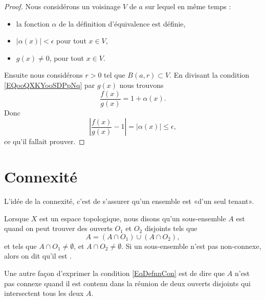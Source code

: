 \begin{proof}
	Nous considérons un voisinage \( V\) de \( a\) sur lequel en même temps :
	\begin{itemize}
		\item
		      la fonction \( \alpha\) de la définition d'équivalence est définie,
		\item
		      \( | \alpha(x) |<\epsilon\) pour tout \( x\in V\),
		\item
		      \( g(x)\neq 0\), pour tout \( x\in V\).
	\end{itemize}
	Ensuite nous considérons \( r>0\) tel que \( B(a,r)\subset V\). En divisant la condition \eqref{EQooQXKYooSDPpNq} par \( g(x)\) nous trouvons
	\begin{equation}
		\frac{ f(x) }{ g(x) }=1+\alpha(x).
	\end{equation}
	Donc
	\begin{equation}
		| \frac{ f(x) }{ g(x) }-1 |=| \alpha(x) |\leq \epsilon,
	\end{equation}
	ce qu'il fallait prouver.
\end{proof}


\section{Connexité}

L'idée de la connexité, c'est de s'assurer qu'un ensemble est «d'un seul tenant».

\begin{definition}  \label{DefIRKNooJJlmiD}
	Lorsque $X$ est un espace topologique, nous disons qu'un sous-ensemble $A$ est  quand on peut trouver des ouverts $O_1$ et $O_2$ disjoints tels que
	\begin{equation}    \label{EqDefnnCon}
		A=(A\cap O_1)\cup (A\cap O_2),
	\end{equation}
	et tels que $A\cap O_1\neq\emptyset$, et $A\cap O_2\neq\emptyset$. Si un sous-ensemble n'est pas non-connexe, alors on dit qu'il est .
\end{definition}
Une autre façon d'exprimer la condition \eqref{EqDefnnCon} est de dire que $A$ n'est pas connexe quand il est contenu dans la réunion de deux ouverts disjoints qui intersectent tous les deux $A$.


